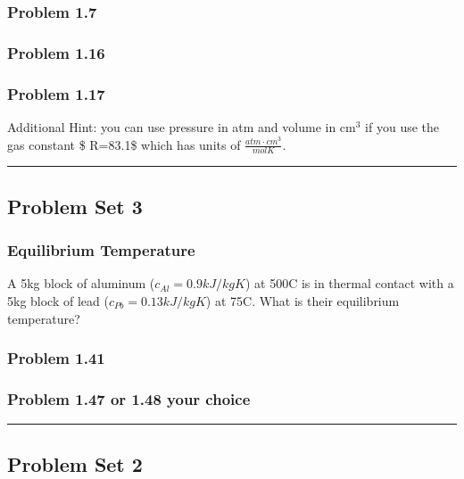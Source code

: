\documentclass[11pt]{article}
\begin{document}
\subsubsection{Problem 1.7}\label{problem-1.7}

\subsubsection{Problem 1.16}\label{problem-1.16}

\subsubsection{Problem 1.17}\label{problem-1.17}

Additional Hint: you can use pressure in atm and volume in cm\(^3\) if
you use the gas constant \$ R=83.1\$ which has units of
\(\frac{atm \cdot cm^3}{mol K}\).

\begin{center}\rule{0.5\linewidth}{0.5pt}\end{center}

    \subsection{Problem Set 3}\label{problem-set-3}

\subsubsection{Equilibrium Temperature}\label{equilibrium-temperature}

A 5kg block of aluminum (\(c_{Al} = 0.9 kJ/kgK\)) at 500C is in thermal
contact with a 5kg block of lead (\(c_{Pb} = 0.13kJ/kgK\)) at 75C. What
is their equilibrium temperature?

\subsubsection{Problem 1.41}\label{problem-1.41}

\subsubsection{Problem 1.47 or 1.48 your
choice}\label{problem-1.47-or-1.48-your-choice}

\begin{center}\rule{0.5\linewidth}{0.5pt}\end{center}

    \subsection{Problem Set 2}\label{problem-set-2}
\end{document}
